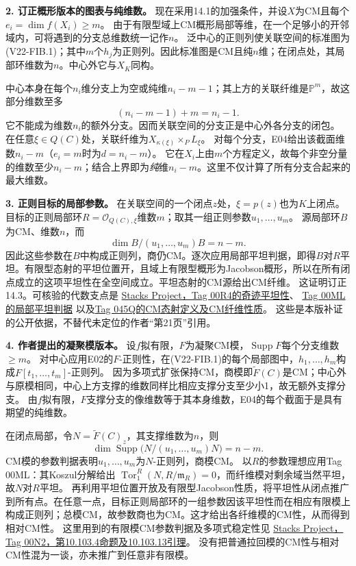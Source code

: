 \documentclass[UTF8,a4paper]{ctexbook}
\begin{document}
\noindent\textbf{2. 订正概形版本的图表与纯维数。}
现在采用14.1的加强条件，并设$X$为CM且每个$e_i=\dim f(X_i)\geq m$。
由于有限型域上CM概形局部等维，在一个足够小的开邻域内，可将遇到的分支总维数统一记作$n$。
泛中心的正则列使关联空间的标准图为(V22-FIB.1)；其中$m$个$h_j$为正则列。因此标准图是CM且纯$n$维；在闭点处，其局部环维数为$n$。中心外它与$X_K$同构。

中心本身在每个$n_i$维分支上为空或纯维$n_i-m-1$；其上方的关联纤维是$\mathbb P^m$，故这部分维数至多
\[
(n_i-m-1)+m=n_i-1.
\]
它不能成为维数$n_i$的额外分支。因而关联空间的分支正是中心外各分支的闭包。
在任意$\xi\in Q(C)$处，关联纤维为$X_{\kappa(\xi)}\times_P L_\xi$。
对每个分支，E04给出该截面维数$n_i-m$（$e_i=m$时为$d=n_i-m$）。
它在$X_i$上由$m$个方程定义，故每个非空分量的维数至少$n_i-m$；结合上界即为\emph{纯}维$n_i-m$。这里不仅计算了所有分支合起来的最大维数。

\noindent\textbf{3. 正则目标的局部参数。}
在关联空间的一个闭点$z$处，$\xi=p(z)$也为$K$上闭点。目标的正则局部环$R=\mathcal O_{Q(C),\xi}$维数$m$；取其一组正则参数$u_1,\ldots,u_m$。
源局部环$B$为CM、维数$n$，而
\[
\dim B/(u_1,\ldots,u_m)B=n-m.
\]
因此这些参数在$B$中构成正则列，商仍CM。逐次应用局部平坦判据，即得$B$对$R$平坦。有限型态射的平坦位置开，且域上有限型概形为Jacobson概形，所以在所有闭点成立的这项平坦性在全空间成立。平坦态射的CM源给出CM纤维。
这证明订正14.3。可核验的代数支点是
\href{https://stacks.math.columbia.edu/tag/00R4}{Stacks Project，Tag 00R4的奇迹平坦性}、
\href{https://stacks.math.columbia.edu/tag/00ML}{Tag 00ML的局部平坦判据}
以及\href{https://stacks.math.columbia.edu/tag/045Q}{Tag 045Q的CM态射定义及CM纤维性质}。
这些是本版补证的公开依据，不替代未定位的作者“第21页”引用。

\noindent\textbf{4. 作者提出的凝聚模版本。}
设$f$拟有限，$F$为凝聚CM模，$\operatorname{Supp}F$每个分支维数$\geq m$。
对中心应用E02的$F$-正则性，在(V22-FIB.1)的每个局部图中，$h_1,\ldots,h_m$构成$F[t_1,\ldots,t_m]$-正则列。
因为多项式扩张保持CM，商模即$\widetilde F(C)$是CM；中心外与原模相同，中心上方支撑的维数同样比相应支撑分支至少小1，故无额外支撑分支。
由$f$拟有限，$F$支撑分支的像维数等于其本身维数，E04的每个截面于是具有期望的纯维数。

在闭点局部，令$N=\widetilde F(C)_z$，其支撑维数为$n$，则
\[
\dim\operatorname{Supp}\bigl(N/(u_1,\ldots,u_m)N\bigr)=n-m.
\]
CM模的参数判据表明$u_1,\ldots,u_m$为$N$-正则列，商模CM。
以$R$的参数理想应用Tag 00ML：其Koszul分解给出
$\operatorname{Tor}_1^R(N,R/\mathfrak m_R)=0$，而纤维模对剩余域当然平坦，故$N$对$R$平坦。
再利用平坦位置开放及有限型Jacobson性质，将平坦性从闭点推广到所有点。在任意一点，目标正则局部环的一组参数因该平坦性而在相应有限模上构成正则列；总模CM，故参数商也为CM。这才给出各纤维模的CM性，从而得到相对CM性。
这里用到的有限模CM参数判据及多项式稳定性见
\href{https://stacks.math.columbia.edu/tag/00N2}{Stacks Project，Tag 00N2，第10.103.4命题及10.103.13引理}。
没有把普通拉回模的CM性与相对CM性混为一谈，亦未推广到任意非有限模。
\end{document}
